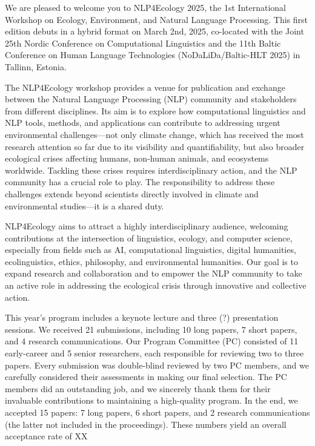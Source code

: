We are pleased to welcome you to NLP4Ecology 2025, the 1st International Workshop on Ecology, Environment, and Natural Language Processing. This first edition debuts in a hybrid format on March 2nd, 2025, co-located with the Joint 25th Nordic Conference on Computational Linguistics and the 11th Baltic Conference on Human Language Technologies (NoDaLiDa/Baltic-HLT 2025) in Tallinn, Estonia.

The NLP4Ecology workshop provides a venue for publication and exchange between the Natural Language Processing (NLP) community and stakeholders from different disciplines. Its aim is to explore how computational linguistics and NLP tools, methods, and applications can contribute to addressing urgent environmental challenges—not only climate change, which has received the most research attention so far due to its visibility and quantifiability, but also broader ecological crises affecting humans, non-human animals, and ecosystems worldwide. Tackling these crises requires interdisciplinary action, and the NLP community has a crucial role to play. The responsibility to address these challenges extends beyond scientists directly involved in climate and environmental studies—it is a shared duty.

NLP4Ecology aims to attract a highly interdisciplinary audience, welcoming contributions at the intersection of linguistics, ecology, and computer science, especially from fields such as AI, computational linguistics, digital humanities, ecolinguistics, ethics, philosophy, and environmental humanities. Our goal is to expand research and collaboration and to empower the NLP community to take an active role in addressing the ecological crisis through innovative and collective action.

This year's program includes a keynote lecture and three (?) presentation sessions. We received 21 submissions, including 10 long papers, 7 short papers, and 4 research communications. Our Program Committee (PC) consisted of 11 early-career and 5 senior researchers, each responsible for reviewing two to three papers. Every submission was double-blind reviewed by two PC members, and we carefully considered their assessments in making our final selection. The PC members did an outstanding job, and we sincerely thank them for their invaluable contributions to maintaining a high-quality program. In the end, we accepted 15 papers: 7 long papers, 6 short papers, and 2 research communications (the latter not included in the proceedings). These numbers yield an overall acceptance rate of XX%


